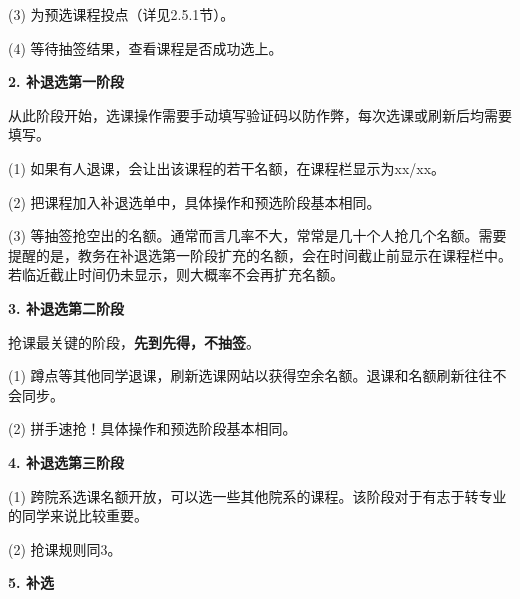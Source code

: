 \documentclass[11pt,oneside]{book}
\begin{document}
(3) 为预选课程投点（详见2.5.1节）。

\vspace{10pt}

(4) 等待抽签结果，查看课程是否成功选上。

\vspace{10pt}

\textbf{2. 补退选第一阶段}

从此阶段开始，选课操作需要手动填写验证码以防作弊，每次选课或刷新后均需要填写。

\vspace{10pt}

(1) 如果有人退课，会让出该课程的若干名额，在课程栏显示为xx/xx。

\vspace{10pt}

(2) 把课程加入补退选单中，具体操作和预选阶段基本相同。

\vspace{10pt}

(3) 等抽签抢空出的名额。通常而言几率不大，常常是几十个人抢几个名额。需要提醒的是，教务在补退选第一阶段扩充的名额，会在时间截止前显示在课程栏中。若临近截止时间仍未显示，则大概率不会再扩充名额。

\vspace{10pt}

\textbf{3. 补退选第二阶段}

抢课最关键的阶段，\textbf{先到先得，不抽签}。

\vspace{10pt}

(1) 蹲点等其他同学退课，刷新选课网站以获得空余名额。退课和名额刷新往往不会同步。

\vspace{10pt}

(2) 拼手速抢！具体操作和预选阶段基本相同。

\vspace{10pt}

\textbf{4. 补退选第三阶段}

\vspace{10pt}

(1) 跨院系选课名额开放，可以选一些其他院系的课程。该阶段对于有志于转专业的同学来说比较重要。

\vspace{10pt}

(2) 抢课规则同3。

\vspace{10pt}

\textbf{5. 补选}
\end{document}

